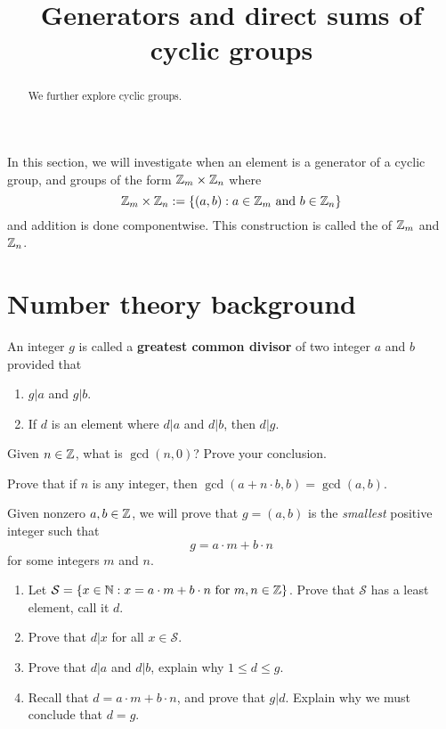 \documentclass{ximera}
\title{Generators and direct sums of cyclic groups}
\begin{document}
\begin{abstract}
  We further explore cyclic groups.
\end{abstract}
\maketitle

In this section, we will investigate when an element is a generator of
a cyclic group, and groups of the form $\mathbb Z_m\times \mathbb Z_n$ where
\[
\mathbb Z_m\times \mathbb Z_n :=\{(a,b):\text{$a\in\mathbb Z_m$ and $b\in\mathbb Z_n$}\}
\]
and addition is done componentwise. This construction is called the
 of $\mathbb Z_m$ and $\mathbb Z_n$.




\section{Number theory background}

\begin{definition} 
An integer $g$ is called a \textbf{greatest common divisor} of two
integer $a$ and $b$ provided that
\begin{enumerate}
\item $g| a$ and $g | b$.
\item If $d$ is an element where $d| a$ and $d | b$, then $d| g$.
\end{enumerate}
\end{definition}

\begin{exercise} 
Given $n\in \mathbb Z$, what is $\gcd(n,0)$? Prove your conclusion.
\end{exercise}

\begin{exercise} 
Prove that if $n$ is any integer, then $\gcd(a + n\cdot b, b) = \gcd(a, b)$.
\end{exercise}




\begin{theorem}\label{E:EL1}
  Given nonzero $a,b\in\mathbb Z$, we will prove that $g=(a,b)$ is the
  \textit{smallest} positive integer such that
  \[
  g = a\cdot m +b\cdot n
  \]
  for some integers $m$ and $n$.
  \begin{enumerate}
  \item Let $\mathcal S = \{x\in \mathbb N: x = a\cdot m +b\cdot n\text{ for } m,n\in
    \mathbb Z\}$. Prove that $\mathcal S$ has a least element, call it $d$.
  \item Prove that $d| x$ for all $x\in \mathcal S$.
  \item Prove that $d| a$ and $d| b$, explain why $1 \le d \le g$.
  \item Recall that $d = a\cdot m +b\cdot n$, and prove that $g |
    d$. Explain why we must conclude that $d = g$.
  \end{enumerate}
\end{theorem}
\end{document}
